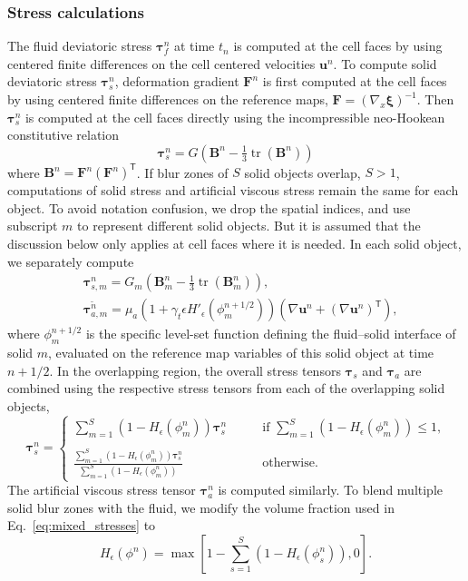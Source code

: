 \documentclass[times, 10pt]{article}
\renewcommand{\vec}[1]{\mathbf{#1}}
\newcommand{\vu}{\vec{u}}
\newcommand{\vF}{\vec{F}}
\newcommand{\vxi}{\boldsymbol\xi}
\newcommand{\vtau}{\boldsymbol\tau}
\newcommand{\trans}{\mathsf{T}}
\DeclareMathOperator{\Tr}{tr}
\begin{document}
\subsubsection*{Stress calculations}
The fluid deviatoric stress $\vtau_f^n$ at time $t_n$ is computed at the cell faces by using centered finite differences on the cell centered velocities $\vu^n$.
To compute solid deviatoric stress $\vtau_s^n$, deformation gradient $\vF^n$ is first computed at the cell faces by using centered finite differences on the reference maps, $\vF = (\nabla_x \vxi)^{-1}$.
Then $\vtau_s^n$ is computed at the cell faces directly using the incompressible neo-Hookean constitutive relation
\begin{equation}
  \vtau_s^n = G\left ( \mathbf B^n - \tfrac13\Tr(\mathbf B^n)\right)
\end{equation}
where $\mathbf B^n = \vF^n (\vF^n)^\trans$.
If blur zones of $S$ solid objects overlap, $S>1$,
computations of solid stress and artificial viscous stress remain the same for each object.
To avoid notation confusion, we drop the spatial indices, and use subscript $m$ to represent different solid objects.
But it is assumed that the discussion below only applies at cell faces where it is needed.
In each solid object, we separately compute
\begin{align}
&\vtau_{s, m}^n = G_m\left ( \mathbf B_m^n - \tfrac13\Tr(\mathbf B_m^n)\right),\\
&\vtau_{a, m}^{\tilde{n}} = \mu_a( 1 + \gamma_t \epsilon H'_\epsilon(\phi_m^{n+1/2})) (\nabla \vu^n + (\nabla \vu^n)^\trans),
\end{align}
where $\phi_m^{n+1/2}$ is the specific level-set function defining the fluid--solid interface of solid $m$, evaluated on the reference map variables of this solid object at time $n+1/2$.
In the overlapping region, the overall stress tensors $\vtau_s$ and $\vtau_a$ are combined using the respective stress tensors from each of the overlapping solid objects, 
\begin{equation}
\vtau_s^n =
\begin{cases}
  \sum_{m=1}^S (1-H_\epsilon(\phi_m^n)) \vtau_s^n & \qquad \text{if $\sum_{m=1}^S (1-H_\epsilon(\phi_m^n)) \le 1$,} \\ \\
\frac{\sum_{m=1}^S (1-H_\epsilon(\phi_m^n)) \vtau_s^n } { \sum_{m=1}^S (1-H_\epsilon(\phi_m^n)) } & \qquad \text{otherwise}.
\end{cases}
\end{equation}
The artificial viscous stress tensor  $\vtau_a^n$ is computed similarly.
To blend multiple solid blur zones with the fluid, we modify the volume fraction used in Eq.~\eqref{eq:mixed_stresses} to
\begin{equation}
H_\epsilon(\phi^n) = \max \left[ 1 - \sum_{s=1}^S (1-H_\epsilon(\phi_s^n)), 0 \right].
\label{eq:mod_heaviside}
\end{equation}
\end{document}
